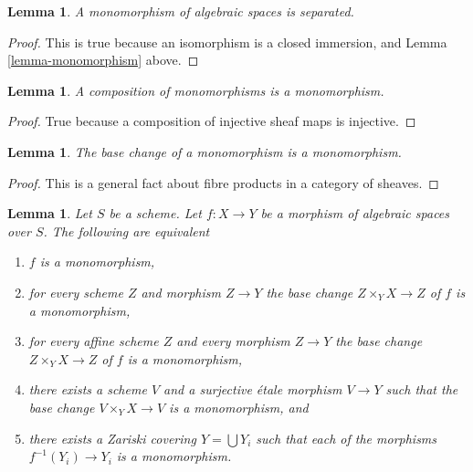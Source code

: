 \documentclass{stacks-project}
\theoremstyle{plain}
\newtheorem{lemma}[subsection]{Lemma}
\theoremstyle{definition}
\theoremstyle{remark}
\numberwithin{equation}{subsection}
\begin{document}
\begin{lemma}
\label{lemma-monomorphism-separated}
A monomorphism of algebraic spaces is separated.
\end{lemma}

\begin{proof}
This is true because an isomorphism is a closed immersion,
and Lemma \ref{lemma-monomorphism} above.
\end{proof}

\begin{lemma}
\label{lemma-composition-monomorphism}
A composition of monomorphisms is a monomorphism.
\end{lemma}

\begin{proof}
True because a composition of injective sheaf maps is injective.
\end{proof}

\begin{lemma}
\label{lemma-base-change-monomorphism}
The base change of a monomorphism is a monomorphism.
\end{lemma}

\begin{proof}
This is a general fact about fibre products in a category of sheaves.
\end{proof}

\begin{lemma}
\label{lemma-monomorphism-local}
Let $S$ be a scheme.
Let $f : X \to Y$ be a morphism of algebraic spaces over $S$.
The following are equivalent
\begin{enumerate}
\item $f$ is a monomorphism,
\item for every scheme $Z$ and morphism $Z \to Y$ the
base change $Z \times_Y X \to Z$ of $f$ is a monomorphism,
\item for every affine scheme $Z$ and every morphism $Z \to Y$ the
base change $Z \times_Y X \to Z$ of $f$ is a monomorphism,
\item there exists a scheme $V$ and a surjective \'etale morphism
$V \to Y$ such that the base change $V \times_Y X \to V$ is a
monomorphism, and
\item there exists a Zariski covering $Y = \bigcup Y_i$ such that each
of the morphisms $f^{-1}(Y_i) \to Y_i$ is a monomorphism.
\end{enumerate}
\end{lemma}
\end{document}
